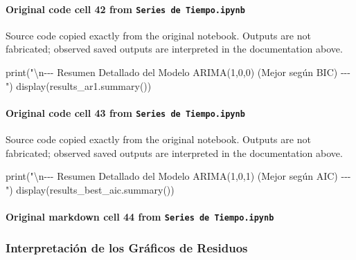 \documentclass[
  11pt,
]{article}
\newenvironment{Shaded}{}{}
\newcommand{\BuiltInTok}[1]{\textcolor[rgb]{0.00,0.50,0.00}{#1}}
\newcommand{\CharTok}[1]{\textcolor[rgb]{0.25,0.44,0.63}{#1}}
\newcommand{\NormalTok}[1]{#1}
\newcommand{\StringTok}[1]{\textcolor[rgb]{0.25,0.44,0.63}{#1}}
\begin{document}
\paragraph{\texorpdfstring{Original code cell 42 from \texttt{Series\ de\ Tiempo.ipynb}}{Original code cell 42 from Series de Tiempo.ipynb}}\label{original-code-cell-42-from-series-de-tiempoipynb}

Source code copied exactly from the original notebook. Outputs are not fabricated; observed saved outputs are interpreted in the documentation above.

\begin{Shaded}
\begin{Highlighting}[]
\BuiltInTok{print}\NormalTok{(}\StringTok{"}\CharTok{\textbackslash{}n}\StringTok{{-}{-}{-} Resumen Detallado del Modelo ARIMA(1,0,0) (Mejor según BIC) {-}{-}{-}"}\NormalTok{)}
\NormalTok{display(results\_ar1.summary())}
\end{Highlighting}
\end{Shaded}

\paragraph{\texorpdfstring{Original code cell 43 from \texttt{Series\ de\ Tiempo.ipynb}}{Original code cell 43 from Series de Tiempo.ipynb}}\label{original-code-cell-43-from-series-de-tiempoipynb}

Source code copied exactly from the original notebook. Outputs are not fabricated; observed saved outputs are interpreted in the documentation above.

\begin{Shaded}
\begin{Highlighting}[]
\BuiltInTok{print}\NormalTok{(}\StringTok{"}\CharTok{\textbackslash{}n}\StringTok{{-}{-}{-} Resumen Detallado del Modelo ARIMA(1,0,1) (Mejor según AIC) {-}{-}{-}"}\NormalTok{)}
\NormalTok{display(results\_best\_aic.summary())}
\end{Highlighting}
\end{Shaded}

\paragraph{\texorpdfstring{Original markdown cell 44 from \texttt{Series\ de\ Tiempo.ipynb}}{Original markdown cell 44 from Series de Tiempo.ipynb}}\label{original-markdown-cell-44-from-series-de-tiempoipynb}

\subsubsection{Interpretación de los Gráficos de Residuos}\label{interpretaciuxf3n-de-los-gruxe1ficos-de-residuos}
\end{document}
